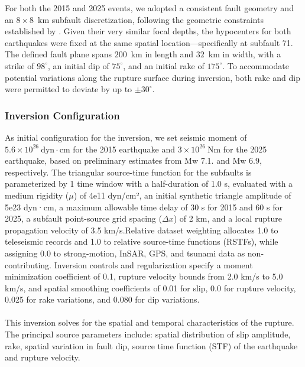 For both the 2015 and 2025 events, we adopted a consistent fault geometry and an $8 \times 8$~km subfault discretization, following the geometric 
constraints established by \cite{Aderhold2016}. Given their very similar focal depths, the hypocenters for both earthquakes were fixed at the same spatial
location—specifically at subfault 71. 
The defined fault plane spans $200$~km in length and $32$~km in width, with a strike of $98^\circ$, an initial dip of $75^\circ$, and an initial 
rake of $175^\circ$. To accommodate potential variations along the rupture surface during inversion, both rake and dip were permitted to deviate by 
up to $\pm 30^\circ$.

\subsubsection*{Inversion Configuration}
As initial configuration for the inversion, we set seismic moment of $5.6 \times 10^{26}~\mathrm{dyn\cdot cm}$ for the 2015 earthquake and
 $3 \times 10^{26}~\mathrm{Nm}$ for the 2025 earthquake, based on preliminary estimates from Mw 7.1. and Mw 6.9, respectively. The triangular source-time function
  for the subfaults is parameterized by 1 time window with a half-duration of 1.0 s, evaluated with a medium rigidity ($\mu$) of 4e11 dyn/cm², an initial
  synthetic triangle amplitude of 5e23 dyn·cm, a maximum allowable time delay of 30 s for 2015 and 60 s for 2025, a subfault point-source grid spacing
   ($\Delta x$) of 2 km, and a local 
  rupture propagation velocity of 3.5 km/s.Relative dataset weighting allocates 1.0 to teleseismic records and 1.0 to relative source-time functions (RSTFs),
   while assigning 0.0 to strong-motion, InSAR, GPS, and tsunami data as non-contributing. Inversion controls and regularization specify a moment minimization coefficient of 0.1,
    rupture velocity bounds from 2.0 km/s to 5.0 km/s, and spatial smoothing coefficients of 0.01 for slip, 0.0 
    for rupture velocity, 0.025 for rake variations, and 0.080 for dip variations. 
\paragraph*{}
This inversion solves for the spatial and temporal characteristics of
the rupture. The principal source parameters include: spatial distribution of slip amplitude, rake, spatial variation in fault dip, source time function (STF)
of the earthquake and rupture velocity.



